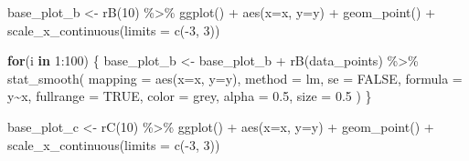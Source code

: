 \documentclass[
]{book}
\newenvironment{Shaded}{\begin{snugshade}}{\end{snugshade}}
\newcommand{\AttributeTok}[1]{\textcolor[rgb]{0.77,0.63,0.00}{#1}}
\newcommand{\ConstantTok}[1]{\textcolor[rgb]{0.00,0.00,0.00}{#1}}
\newcommand{\ControlFlowTok}[1]{\textcolor[rgb]{0.13,0.29,0.53}{\textbf{#1}}}
\newcommand{\DecValTok}[1]{\textcolor[rgb]{0.00,0.00,0.81}{#1}}
\newcommand{\FloatTok}[1]{\textcolor[rgb]{0.00,0.00,0.81}{#1}}
\newcommand{\FunctionTok}[1]{\textcolor[rgb]{0.00,0.00,0.00}{#1}}
\newcommand{\NormalTok}[1]{#1}
\newcommand{\OtherTok}[1]{\textcolor[rgb]{0.56,0.35,0.01}{#1}}
\newcommand{\SpecialCharTok}[1]{\textcolor[rgb]{0.00,0.00,0.00}{#1}}
\newcommand{\StringTok}[1]{\textcolor[rgb]{0.31,0.60,0.02}{#1}}
\theoremstyle{definition}
\theoremstyle{definition}
\theoremstyle{definition}
\theoremstyle{definition}
\theoremstyle{remark}
\begin{document}
\begin{Shaded}
\begin{Highlighting}[]
\NormalTok{base\_plot\_b }\OtherTok{\textless{}{-}} \FunctionTok{rB}\NormalTok{(}\DecValTok{10}\NormalTok{) }\SpecialCharTok{\%\textgreater{}\%}  
  \FunctionTok{ggplot}\NormalTok{() }\SpecialCharTok{+} 
  \FunctionTok{aes}\NormalTok{(}\AttributeTok{x=}\NormalTok{x, }\AttributeTok{y=}\NormalTok{y) }\SpecialCharTok{+} 
  \FunctionTok{geom\_point}\NormalTok{() }\SpecialCharTok{+} 
  \FunctionTok{scale\_x\_continuous}\NormalTok{(}\AttributeTok{limits =} \FunctionTok{c}\NormalTok{(}\SpecialCharTok{{-}}\DecValTok{3}\NormalTok{, }\DecValTok{3}\NormalTok{))}

\ControlFlowTok{for}\NormalTok{(i }\ControlFlowTok{in} \DecValTok{1}\SpecialCharTok{:}\DecValTok{100}\NormalTok{) \{ }
\NormalTok{    base\_plot\_b }\OtherTok{\textless{}{-}}\NormalTok{ base\_plot\_b }\SpecialCharTok{+} \FunctionTok{rB}\NormalTok{(data\_points) }\SpecialCharTok{\%\textgreater{}\%} 
      \FunctionTok{stat\_smooth}\NormalTok{(}
        \AttributeTok{mapping =} \FunctionTok{aes}\NormalTok{(}\AttributeTok{x=}\NormalTok{x, }\AttributeTok{y=}\NormalTok{y), }
        \AttributeTok{method  =} \StringTok{\textquotesingle{}lm\textquotesingle{}}\NormalTok{,         }\AttributeTok{se =} \ConstantTok{FALSE}\NormalTok{, }
        \AttributeTok{formula =} \StringTok{\textquotesingle{}y\textasciitilde{}x\textquotesingle{}}\NormalTok{, }\AttributeTok{fullrange =} \ConstantTok{TRUE}\NormalTok{,}
        \AttributeTok{color   =} \StringTok{\textquotesingle{}grey\textquotesingle{}}\NormalTok{,    }\AttributeTok{alpha =} \FloatTok{0.5}\NormalTok{,}
        \AttributeTok{size    =} \FloatTok{0.5}
\NormalTok{      )}
\NormalTok{  \}}

\NormalTok{base\_plot\_c }\OtherTok{\textless{}{-}} \FunctionTok{rC}\NormalTok{(}\DecValTok{10}\NormalTok{) }\SpecialCharTok{\%\textgreater{}\%}  
  \FunctionTok{ggplot}\NormalTok{() }\SpecialCharTok{+} 
  \FunctionTok{aes}\NormalTok{(}\AttributeTok{x=}\NormalTok{x, }\AttributeTok{y=}\NormalTok{y) }\SpecialCharTok{+} 
  \FunctionTok{geom\_point}\NormalTok{() }\SpecialCharTok{+} 
  \FunctionTok{scale\_x\_continuous}\NormalTok{(}\AttributeTok{limits =} \FunctionTok{c}\NormalTok{(}\SpecialCharTok{{-}}\DecValTok{3}\NormalTok{, }\DecValTok{3}\NormalTok{))}


\end{Highlighting}
\end{Shaded}
\end{document}
